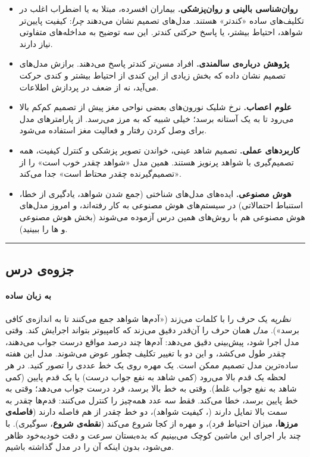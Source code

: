 \begin{itemize}
\tightlist
\item
  \textbf{روان‌شناسی بالینی و روان‌پزشکی.} بیماران افسرده، مبتلا به
   یا اضطراب اغلب در تکلیف‌های ساده «کندتر» هستند. مدل‌های تصمیم
  نشان می‌دهند \emph{چرا}: کیفیت پایین‌تر شواهد، احتیاط بیشتر، یا پاسخ
  حرکتی کندتر. این سه توضیح به مداخله‌های متفاوتی نیاز دارند.
\item
  \textbf{پژوهش درباره‌ی سالمندی.} افراد مسن‌تر کندتر پاسخ می‌دهند. برازش
  مدل‌های تصمیم نشان داده که بخش زیادی از این کندی از احتیاط بیشتر و کندی
  حرکت می‌آید، نه از ضعف در پردازش اطلاعات.
\item
  \textbf{علوم اعصاب.} نرخ شلیک نورون‌های بعضی نواحی مغز پیش از تصمیم
  کم‌کم بالا می‌رود تا به یک آستانه برسد؛ خیلی شبیه  که به
  مرز می‌رسد. از پارامترهای مدل برای وصل کردن رفتار و فعالیت مغز استفاده
  می‌شود.
\item
  \textbf{کاربردهای عملی.} تصمیم شاهد عینی، خواندن تصویر پزشکی و کنترل
  کیفیت، همه تصمیم‌گیری با شواهد پرنویز هستند. همین مدل «شواهد چقدر خوب
  است» را از «تصمیم‌گیرنده چقدر محتاط است» جدا می‌کند.
\item
  \textbf{هوش مصنوعی.} ایده‌های مدل‌های شناختی (جمع شدن شواهد، یادگیری از
  خطا، استنباط احتمالاتی) در سیستم‌های هوش مصنوعی به کار رفته‌اند، و امروز
  مدل‌های هوش مصنوعی هم با روش‌های همین درس آزموده می‌شوند (بخش هوش مصنوعی
  و ها را ببینید).
\end{itemize}

\begin{center}\rule{0.5\linewidth}{0.5pt}\end{center}


\subsection{جزوه‌ی درس}

\paragraph{به زبان ساده}

\emph{نظریه} یک حرف را با کلمات می‌زند («آدم‌ها شواهد جمع می‌کنند تا به
اندازه‌ی کافی برسد»). \emph{مدل} همان حرف را آن‌قدر دقیق می‌زند که کامپیوتر
بتواند اجرایش کند. وقتی مدل اجرا شود، پیش‌بینی دقیق می‌دهد: آدم‌ها چند درصد
مواقع درست جواب می‌دهند، چقدر طول می‌کشد، و این دو با تغییر تکلیف چطور عوض
می‌شوند. مدل این هفته ساده‌ترین مدل تصمیم ممکن است. یک مهره روی یک خط عددی
را تصور کنید. در هر لحظه یک قدم بالا می‌رود (کمی شاهد به نفع جواب درست)
یا یک قدم پایین (کمی شاهد به نفع جواب غلط). وقتی به خط بالا برسد، فرد
درست جواب می‌دهد؛ وقتی به خط پایین برسد، خطا می‌کند. فقط سه عدد همه‌چیز را
کنترل می‌کنند: قدم‌ها چقدر به سمت بالا تمایل دارند (\textbf{}،
کیفیت شواهد)، دو خط چقدر از هم فاصله دارند (\textbf{فاصله‌ی مرزها}، میزان
احتیاط فرد)، و مهره از کجا شروع می‌کند (\textbf{نقطه‌ی شروع}، سوگیری). با
چند بار اجرای این ماشین کوچک می‌بینیم که بده‌بستان سرعت و دقت خودبه‌خود
ظاهر می‌شود، بدون اینکه آن را در مدل گذاشته باشیم.

